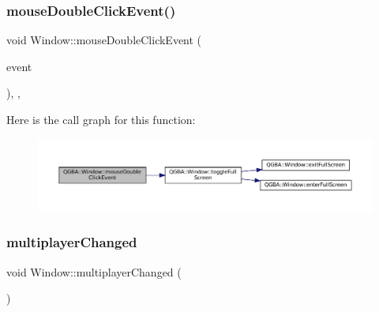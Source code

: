 \subsubsection{\texorpdfstring{mouse\+Double\+Click\+Event()}{mouseDoubleClickEvent()}}
{\footnotesize\ttfamily void Window\+::mouse\+Double\+Click\+Event (\begin{DoxyParamCaption}\item[{Q\+Mouse\+Event $\ast$}]{event }\end{DoxyParamCaption})\hspace{0.3cm}{\ttfamily [override]}, {\ttfamily [protected]}, {\ttfamily [virtual]}}

Here is the call graph for this function\+:
\nopagebreak
\begin{figure}[H]
\begin{center}
\leavevmode
\includegraphics[width=350pt]{class_q_g_b_a_1_1_window_a98f5456e4ef7083a5719f929b1520b4e_cgraph}
\end{center}
\end{figure}
\mbox{\label{class_q_g_b_a_1_1_window_a26248c798c9d9d49932b7ae417598bea}} 
\subsubsection{\texorpdfstring{multiplayer\+Changed}{multiplayerChanged}}
{\footnotesize\ttfamily void Window\+::multiplayer\+Changed (\begin{DoxyParamCaption}{ }\end{DoxyParamCaption})\hspace{0.3cm}{\ttfamily [slot]}}

